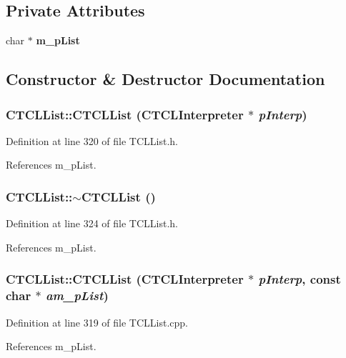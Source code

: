 \subsection*{Private Attributes}
\begin{CompactItemize}
\item 
char $\ast$ {\bf m\_\-p\-List}
\end{CompactItemize}


\subsection{Constructor \& Destructor Documentation}
\subsubsection{\setlength{\rightskip}{0pt plus 5cm}CTCLList::CTCLList ({\bf CTCLInterpreter} $\ast$ {\em p\-Interp})\hspace{0.3cm}{\tt  [inline]}}\label{classCTCLList_a0}




Definition at line 320 of file TCLList.h.

References m\_\-p\-List.
\subsubsection{\setlength{\rightskip}{0pt plus 5cm}CTCLList::$\sim$CTCLList ()\hspace{0.3cm}{\tt  [inline]}}\label{classCTCLList_a1}




Definition at line 324 of file TCLList.h.

References m\_\-p\-List.
\subsubsection{\setlength{\rightskip}{0pt plus 5cm}CTCLList::CTCLList ({\bf CTCLInterpreter} $\ast$ {\em p\-Interp}, const char $\ast$ {\em am\_\-p\-List})}\label{classCTCLList_a2}




Definition at line 319 of file TCLList.cpp.

References m\_\-p\-List.
